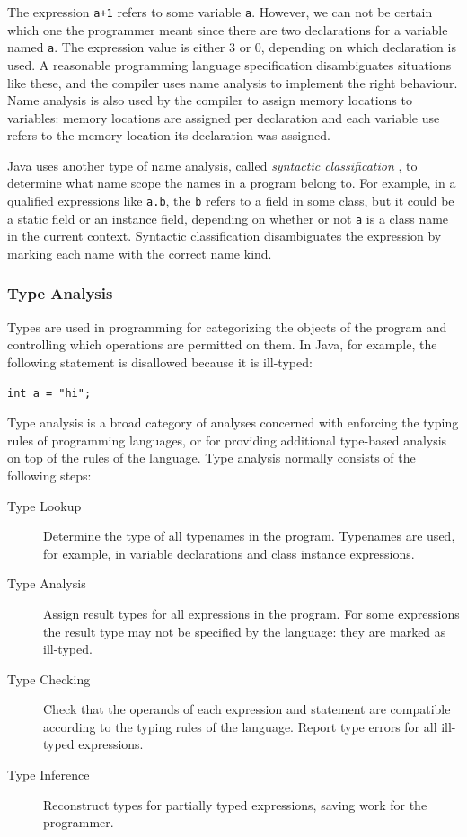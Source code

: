 \documentclass[10pt, twoside, openright]{book}
\begin{document}
\noindent
The expression \verb'a+1' refers to some variable \verb'a'. However, we can not be
certain which one the programmer meant since there are two
declarations for a variable named \verb'a'. The expression value is either
3 or 0, depending on which declaration is used.
A reasonable programming language specification disambiguates situations like these,
and the compiler uses name analysis to implement the right behaviour.
Name analysis is also used by the compiler to assign memory locations to
variables: memory locations are assigned per declaration and each variable use refers
to the memory location its declaration was assigned.

Java uses another type of name analysis, called \emph{syntactic classification} \cite[\S 6.5.1]{jls7},
to determine what name scope the names in a program belong to.
For example, in a qualified expressions like \texttt{a.b},
the \texttt{b} refers to a field in some class, but it could be a static
field or an instance field, depending on whether or not \texttt{a} is a class name in the current
context.
Syntactic classification disambiguates the expression by marking each name with
the correct name kind.


\subsubsection{Type Analysis}

Types are used in programming for categorizing the objects of the program and
controlling which operations are permitted on them. In Java, for example,
the following statement is disallowed because it is ill-typed:

\begin{lstlisting}
int a = "hi";
\end{lstlisting}

Type analysis is a broad category of analyses concerned with enforcing the typing
rules of programming languages, or for providing additional type-based analysis on
top of the rules of the language.
Type analysis normally consists of the following steps:

\begin{description}
  \item[Type Lookup] Determine the type of all typenames in the program.
    Typenames are used, for example, in variable declarations and class instance expressions.
  \item[Type Analysis] Assign result types for all expressions in the program. For some expressions
    the result type may not be specified by the language: they are marked as ill-typed.
  \item[Type Checking] Check that the operands of each expression and statement
    are compatible according
    to the typing rules of the language. Report type errors for all ill-typed expressions.
  \item[Type Inference]
    Reconstruct types for partially typed expressions, saving work for the programmer.
\end{description}
\end{document}
